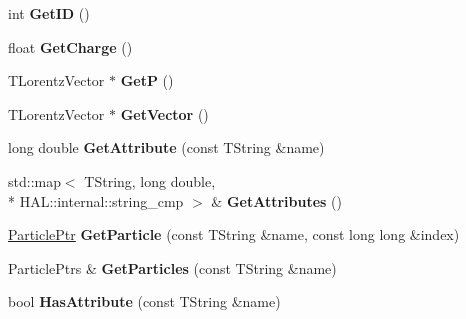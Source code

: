 \begin{DoxyCompactItemize}
\item 
\hypertarget{class_h_a_l_1_1_generic_particle_adb269fa3b951f48d41d46f29501849a0}{int {\bfseries Get\+I\+D} ()}\label{class_h_a_l_1_1_generic_particle_adb269fa3b951f48d41d46f29501849a0}

\item 
\hypertarget{class_h_a_l_1_1_generic_particle_a2f681e1590dd3644844d99267c8f74ed}{float {\bfseries Get\+Charge} ()}\label{class_h_a_l_1_1_generic_particle_a2f681e1590dd3644844d99267c8f74ed}

\item 
\hypertarget{class_h_a_l_1_1_generic_particle_a113c67f6413960990c922e2c5bf63455}{T\+Lorentz\+Vector $\ast$ {\bfseries Get\+P} ()}\label{class_h_a_l_1_1_generic_particle_a113c67f6413960990c922e2c5bf63455}

\item 
\hypertarget{class_h_a_l_1_1_generic_particle_a22f27923168040b2f8273b909830a7fa}{T\+Lorentz\+Vector $\ast$ {\bfseries Get\+Vector} ()}\label{class_h_a_l_1_1_generic_particle_a22f27923168040b2f8273b909830a7fa}

\item 
\hypertarget{class_h_a_l_1_1_generic_particle_aa0dcd8725c4ca8c7c927b79fa6565e6b}{long double {\bfseries Get\+Attribute} (const T\+String \&name)}\label{class_h_a_l_1_1_generic_particle_aa0dcd8725c4ca8c7c927b79fa6565e6b}

\item 
\hypertarget{class_h_a_l_1_1_generic_particle_ac592f263b62437d8176156c640d2d59d}{std\+::map$<$ T\+String, long double, \\*
H\+A\+L\+::internal\+::string\+\_\+cmp $>$ \& {\bfseries Get\+Attributes} ()}\label{class_h_a_l_1_1_generic_particle_ac592f263b62437d8176156c640d2d59d}

\item 
\hypertarget{class_h_a_l_1_1_generic_particle_aa6f6dd45c53b81bdcda0daf9872d3dd6}{\hyperlink{class_h_a_l_1_1_generic_particle}{Particle\+Ptr} {\bfseries Get\+Particle} (const T\+String \&name, const long long \&index)}\label{class_h_a_l_1_1_generic_particle_aa6f6dd45c53b81bdcda0daf9872d3dd6}

\item 
\hypertarget{class_h_a_l_1_1_generic_particle_ae82f028aef354682aaded70b93da06de}{Particle\+Ptrs \& {\bfseries Get\+Particles} (const T\+String \&name)}\label{class_h_a_l_1_1_generic_particle_ae82f028aef354682aaded70b93da06de}

\item 
\hypertarget{class_h_a_l_1_1_generic_particle_a09766ae2f607206b0bb623855f5d11d2}{bool {\bfseries Has\+Attribute} (const T\+String \&name)}\label{class_h_a_l_1_1_generic_particle_a09766ae2f607206b0bb623855f5d11d2}


\end{DoxyCompactItemize}
